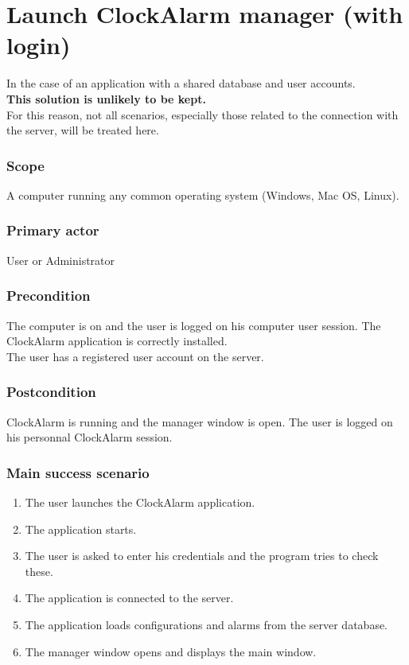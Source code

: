 \section{Launch ClockAlarm manager (with login)}\label{subsec:usecase_launch_log}
In the case of an application with a shared database and user accounts.
\\ \textbf{This solution is unlikely to be kept.}
\\For this reason, not all scenarios, especially those related to the connection with the server, will be treated here.
\subsubsection{Scope}
A computer running any common operating system (Windows, Mac OS, Linux).
\subsubsection{Primary actor}
User or Administrator
\subsubsection{Precondition}
The computer is on and the user is logged on his computer user session. The ClockAlarm application is correctly installed.
\\ The user has a registered user account on the server.
\subsubsection{Postcondition}
ClockAlarm is running and the manager window is open. The user is logged on his personnal ClockAlarm session.
\subsubsection{Main success scenario}
\begin{enumerate}
	\item The user launches the ClockAlarm application.
	\item\label{itm:ucea_start_wl} The application starts. 
	\item\label{itm:ucea_check_wl} The user is asked to enter his credentials and the program tries to check these.
	\item The application is connected to the server.
	\item\label{itm:ucea_load_wl} The application loads configurations and alarms from the server database.
	\item\label{itm:ucea_winopen_wl} The manager window opens and displays the main window.
\end{enumerate}
